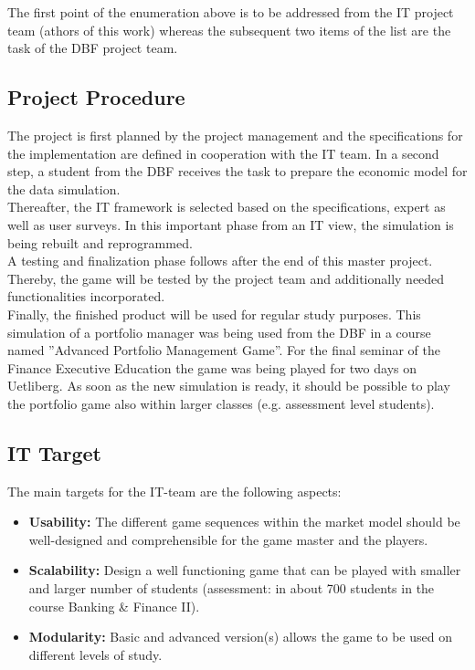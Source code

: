 The first point of the enumeration above is to be addressed from the IT project team (athors of this work) whereas the subsequent two items of the list are the task of the DBF project team.


\subsection{Project Procedure}

The project is first planned by the project management and the specifications for the implementation are defined in cooperation with the IT team. In a second step, a student from the DBF receives the task to prepare the economic model for the data simulation.\\

Thereafter, the IT framework is selected based on the specifications, expert as well as user surveys. In this important phase from an IT view, the simulation is being rebuilt and reprogrammed.\\

A testing and finalization phase follows after the end of this master project. Thereby, the game will be tested by the project team and additionally needed functionalities incorporated.\\

Finally, the finished product will be used for regular study purposes. This simulation of a portfolio manager was being used from the DBF in a course named ''Advanced Portfolio Management Game''. For the final seminar of the Finance Executive Education the game was being played for two days on Uetliberg. As soon as the new simulation is ready, it should be possible to play the portfolio game also within larger classes (e.g. assessment level students).


\subsection{IT Target}
The main targets for the IT-team are the following aspects:
\begin{itemize}
  \item \textbf{Usability:} The different game sequences within the market model should be well-designed and comprehensible for the game master and the players.
  \item \textbf{Scalability:} Design a well functioning game that can be played with smaller and larger number of students (assessment: in about 700 students in the course Banking \& Finance II).
  \item \textbf{Modularity:} Basic and advanced version(s) allows the game to be used on different levels of study.
\end{itemize}

